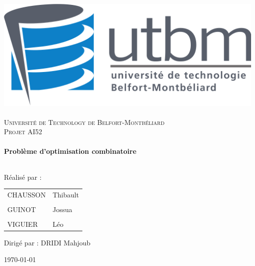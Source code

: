 
\thispagestyle{empty}
\begin{sffamily}
    \begin{center}


        \includegraphics[scale=0.2]{ressources/logo}~\\[1cm]

        \textsc{\LARGE Université de Technology de Belfort-Montbéliard}\\[2cm]

        \textsc{\Large Projet AI52}\\[1cm]

        {\color{UTBMcolor}\HRule} \\[0.4cm]
        { \huge \bfseries Problème d'optimisation combinatoire\\[0.4cm] }
        {\color{UTBMcolor}\HRule} \\[1,5cm]



        \begin{center}
            Réalisé par :

            \vspace{0,2cm}

            \begin{tabular}{ l l }
                CHAUSSON       & Thibault \\
                &          \\
                GUINOT         & Jossua   \\
                &          \\
                VIGUIER        & Léo      \\
            \end{tabular}

            \vspace{0,5cm}

            Dirigé par : DRIDI Mahjoub
        \end{center}




        \vfill

        \textsc{\large \today}

    \end{center}
\end{sffamily}

